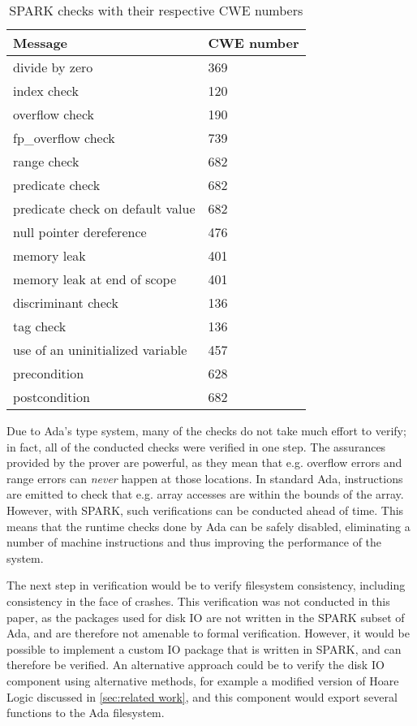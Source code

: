 \begin{table}[tb]
  \centering
  \vspace{1em}
  \renewcommand{\arraystretch}{1.5}
  \begin{tabular}{| l | l |}
    \hline
    \textbf{Message} & \textbf{CWE number} \\ \hline
    divide by zero & 369 \\ \hline
    index check & 120 \\ \hline
    overflow check & 190 \\ \hline
    fp\_overflow check & 739 \\ \hline
    range check & 682 \\ \hline
    predicate check & 682 \\ \hline
    predicate check on default value & 682 \\ \hline
    null pointer dereference & 476 \\ \hline
    memory leak & 401 \\ \hline
    memory leak at end of scope & 401 \\ \hline
    discriminant check & 136 \\ \hline
    tag check & 136 \\ \hline
    use of an uninitialized variable & 457 \\ \hline
    precondition & 628 \\ \hline
    postcondition & 682 \\ \hline
  \end{tabular}
  \renewcommand{\arraystretch}{1}
  \vspace{1em}
  \caption{SPARK checks with their respective CWE numbers}
  \label{tab:checks and cwe numbers}
\end{table}

Due to Ada's type system, many of the checks do not take much effort to verify; in fact, all of the conducted checks were verified in one step.
The assurances provided by the prover are powerful, as they mean that e.g. overflow errors and range errors can \textit{never} happen at those locations.
In standard Ada, instructions are emitted to check that e.g. array accesses are within the bounds of the array.
However, with SPARK, such verifications can be conducted ahead of time.
This means that the runtime checks done by Ada can be safely disabled, eliminating a number of machine instructions and thus improving the performance of the system.

The next step in verification would be to verify filesystem consistency, including consistency in the face of crashes.
This verification was not conducted in this paper, as the packages used for disk IO are not written in the SPARK subset of Ada, and are therefore not amenable to formal verification.
However, it would be possible to implement a custom IO package that is written in SPARK, and can therefore be verified.
An alternative approach could be to verify the disk IO component using alternative methods, for example a modified version of Hoare Logic discussed in \autoref{sec:related work}, and this component would export several functions to the Ada filesystem.

